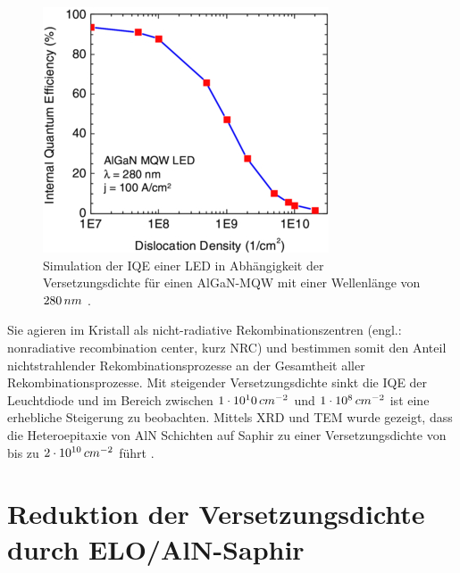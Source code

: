 %
\begin{figure}[h]
\centering
\begin{minipage}[t]{1\linewidth}
\centering
\includegraphics[width=0.5\linewidth]{Bilder/IQEthreadingdisl.PNG}
\end{minipage}%
\caption{Simulation der IQE einer LED in Abhängigkeit der Versetzungsdichte für einen AlGaN-MQW mit einer Wellenlänge von $280 \thinspace nm$ \cite{0268-1242-26-1-014036}.}
 \label{fig:IQEthreadingdisl}
\end{figure}
\noindent
%
Sie agieren im Kristall als nicht-radiative Rekombinationszentren (engl.: nonradiative recombination center, kurz NRC) und bestimmen somit den Anteil nichtstrahlender Rekombinationsprozesse an der Gesamtheit aller Rekombinationsprozesse. Mit steigender Versetzungsdichte sinkt die IQE der Leuchtdiode und im Bereich zwischen $1\cdot 10^10 \thinspace cm^{-2}$ und $1\cdot 10^8 \thinspace cm^{-2}$ ist eine erhebliche Steigerung zu beobachten. Mittels XRD und TEM wurde gezeigt, dass die Heteroepitaxie von AlN Schichten auf Saphir zu einer Versetzungsdichte von bis zu $2\cdot 10^{10} \thinspace cm^{-2}$ führt \cite{zeimeru}.

\section{Reduktion der Versetzungsdichte durch ELO/AlN-Saphir}


